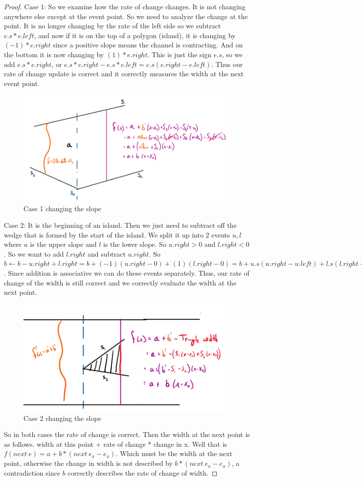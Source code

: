 \documentclass[11pt]{article}
\begin{document}
\begin{proof}
    Case 1: So we examine how the rate of change changes. It is not changing anywhere else except at the event point.
    So we need to analyze the change at the point.
    It is no longer changing by the rate of the left side so
    we subtract $e.s * e.left$, and now if it is on the top of a polygon (island), it is changing by $(-1) * e.right$
    since a positive slope means the channel is contracting. And on the bottom it is now changing by $(1) * e.right$.
    This is just the sign $e.s$, so we add $e.s * e.right$, or $e.s * e.right - e.s *e.left = e.s(e.right - e.left)$.
    Thus our rate of change update is correct and it correctly measures the width at the next event point.
    \begin{figure}[h]
        \centering
        \includegraphics[width = .5\textwidth]{case1.png}
        \caption{Case 1 changing the slope}
    \end{figure}

    Case 2: It is the beginning of an island. Then we just need to subtract off the wedge that is formed by the start of the island.
    We split it up into 2 events $u, l$ where $u$ is the upper slope and $l$ is the lower slope. 
    So $u.right > 0$ and $l.right < 0$. So we want to add $l.right$ and subtract $u.right$. So 
    $b \gets b - u.right + l.right = b + (-1) (u.right - 0) + (1) (l.right - 0) = b + u.s (u.right - u.left) + l.s (l.right - l.left)$.
    Since addition is associative we can do these events separately.
    Thus, our rate of change of the width is still correct and we correctly evaluate the width at the next point.
    \begin{figure}[h]
        \centering
        \includegraphics[width = .5\textwidth]{case2.png}
        \caption{Case 2 changing the slope}
    \end{figure}

    So in both cases the rate of change is correct. Then the width at the next point is as follows.
    width at this point + rate of change * change in x. Well that is $f(next \: e) = a + b * (next \: e_x - e_x)$.
    Which must be the width at the next point, otherwise the change in width is not described by $b * (next \: e_x - e_x)$,
    a contradiction since $b$ correctly describes the rate of change of width.
\end{proof}
\end{document}

